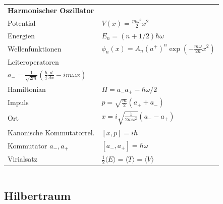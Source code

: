 \documentclass[12pt,a4paper]{article}
\renewcommand{\d}[2]{\frac{d #1}{d #2}}
\renewcommand{\=}[1]{\stackrel{#1}{=}}
\newcommand{\erw}[1]{\langle #1 \rangle}
\theoremstyle{definition}
\theoremstyle{remark}
\begin{document}
\begin{minipage}[t]{.5\linewidth}
\vspace{0pt}
\noindent\begin{tabular}{ll}

\textbf{Harmonischer Oszillator} & \\
Potential & $V(x) = \frac{m\omega^2}{2}x^2$\\
Energien & $E_n = (n + 1/2) \hbar \omega$\\
Wellenfunktionen & $\phi_n(x) = A_n (a^+)^n \exp(-\frac{m\omega}{2\hbar}x^2)$\\
Leiteroperatoren & \makecell[l]{$a_+ = \frac{1}{\sqrt{2m}} (\frac{\hbar}{i} \d{}{x} + i m \omega x)$ \\ $a_- = \frac{1}{\sqrt{2m}} (\frac{\hbar}{i} \d{}{x} - i m \omega x)$}\\
Hamiltonian & $H = a_- a_+ - \hbar \omega /2$\\
Impuls & $p = \sqrt{\frac{m}{2}} (a_+ + a_-)$\\
Ort & $x = i \sqrt{\frac{1}{2m\omega^2}} (a_- - a_+)$\\
Kanonische Kommutatorrel. & $[x, p] = i\hbar$\\
Kommutator $a_-, a_+$ & $[a_-, a_+] = \hbar \omega$\\
Virialsatz & $\frac{1}{2}\erw{E} = \erw{T} = \erw{V}$\\


\end{tabular}
\end{minipage}%
\begin{minipage}[t]{.5\linewidth}
\vspace{0pt}
\begin{tabular}{ll}

\end{tabular}
\end{minipage}





\subsection{Hilbertraum}
\end{document}
